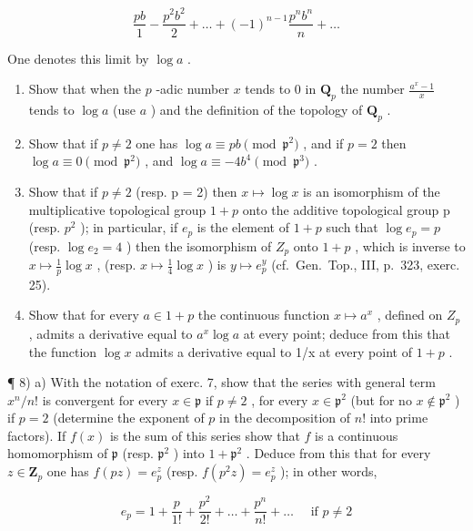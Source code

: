 \[
\frac {p b}{1} - \frac {p ^ {2} b ^ {2}}{2} + \dots + (- 1) ^ {n - 1} \frac {p ^ {n} b ^ {n}}{n} + \dots
\]

One denotes this limit by \(\log a\) .

\begin{enumerate}
\def\labelenumi{\alph{enumi})}
\setcounter{enumi}{1}
\item
  Show that when the \(p\) -adic number \(x\) tends to 0 in \(\mathbf{Q}_p\) the number \(\frac{a^x - 1}{x}\) tends to \(\log a\) (use \(a\) ) and the definition of the topology of \(\mathbf{Q}_p\) .
\item
  Show that if \(p \neq 2\) one has \(\log a \equiv pb \pmod{\mathfrak{p}^2}\) , and if \(p = 2\) then \(\log a \equiv 0 \pmod{\mathfrak{p}^2}\) , and \(\log a \equiv -4b^4 \pmod{\mathfrak{p}^3}\) .
\item
  Show that if \(p \neq 2\) (resp. p = 2) then \(x \mapsto \log x\) is an isomorphism of the multiplicative topological group \(1 + p\) onto the additive topological group p (resp. \(p^{2}\) ); in particular, if \(e_{p}\) is the element of \(1 + p\) such that \(\log e_{p} = p\) (resp. \(\log e_{2} = 4\) ) then the isomorphism of \(Z_{p}\) onto \(1 + p\) , which is inverse to \(x \mapsto \frac{1}{p} \log x\) , (resp. \(x \mapsto \frac{1}{4} \log x\) ) is \(y \mapsto e_{p}^{y}\) (cf.~Gen.~Top., III, p.~323, exerc. 25).
\item
  Show that for every \(a \in 1 + p\) the continuous function \(x \mapsto a^{x}\) , defined on \(Z_{p}\) , admits a derivative equal to \(a^{x} \log a\) at every point; deduce from this that the function \(\log x\) admits a derivative equal to 1/x at every point of \(1 + p\) .
\end{enumerate}

¶ 8) a) With the notation of exerc. 7, show that the series with general term \(x^n / n!\) is convergent for every \(x \in \mathfrak{p}\) if \(p \neq 2\) , for every \(x \in \mathfrak{p}^2\) (but for no \(x \notin \mathfrak{p}^2\) ) if \(p = 2\) (determine the exponent of \(p\) in the decomposition of \(n!\) into prime factors). If \(f(x)\) is the sum of this series show that \(f\) is a continuous homomorphism of \(\mathfrak{p}\) (resp. \(\mathfrak{p}^2\) ) into \(1 + \mathfrak{p}^2\) . Deduce from this that for every \(z \in \mathbf{Z}_p\) one has \(f(pz) = e_p^z\) (resp. \(f(p^2z) = e_p^z\) ); in other words,

\[
e _ {p} = 1 + \frac {p}{1 !} + \frac {p ^ {2}}{2 !} + \dots + \frac {p ^ {n}}{n !} + \dots \quad \text { if } p \neq 2
\]

